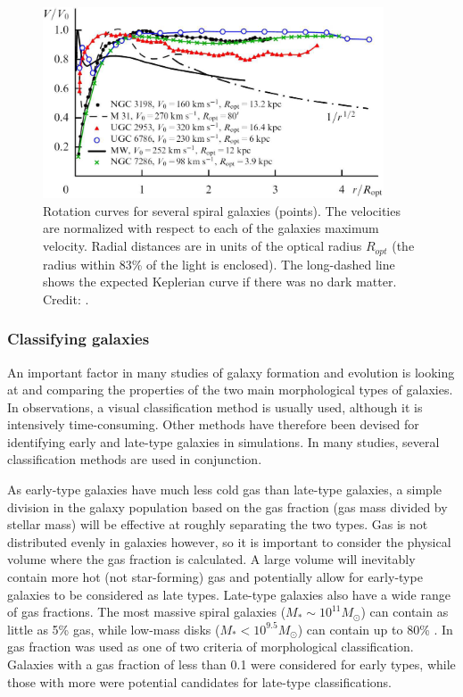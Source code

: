 \begin{figure}
    \centering
    \includegraphics[width=0.9\textwidth]{images/rotation_curves.png}
    \caption{Rotation curves for several spiral galaxies (points). The velocities are normalized with respect to each of the galaxies maximum velocity. Radial distances are in units of the optical radius $R_{opt}$ (the radius within 83\% of the light is enclosed). The long-dashed line shows the expected Keplerian curve if there was no dark matter. Credit: \textcite{Zasov2017}.}
    \label{rotation_curves}
\end{figure}

\subsubsection{Classifying galaxies}

An important factor in many studies of galaxy formation and evolution is looking at and comparing the properties of the two main morphological types of galaxies. In observations, a visual classification method is usually used, although it is intensively time-consuming. %
Other methods have therefore been devised for identifying early and late-type galaxies in simulations. In many studies, several classification methods are used in conjunction. 

As early-type galaxies have much less cold gas than late-type galaxies, a simple division in the galaxy population based on the gas fraction (gas mass divided by stellar mass) will be effective at roughly separating the two types. Gas is not distributed evenly in galaxies however, so it is important to consider the physical volume where the gas fraction is calculated. A large volume will inevitably contain more hot (not star-forming) gas and potentially allow for early-type galaxies to be considered as late types. Late-type galaxies also have a wide range of gas fractions. The most massive spiral galaxies ($M_\ast \sim 10^{11} M_\odot$) can contain as little as 5\% gas, while low-mass disks ($M_\ast < 10^{9.5} M_\odot$) can contain up to 80\% \parencite{Mo2010}. In \textcite{Ferrero2020} gas fraction was used as one of two criteria of morphological classification. Galaxies with a gas fraction of less than 0.1 were considered for early types, while those with more were potential candidates for late-type classifications.

